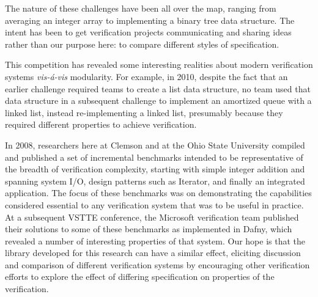 The nature of these challenges have been all over the map, ranging from averaging an integer array to implementing a binary tree data structure.  The intent has been to get verification projects communicating and sharing ideas rather than our purpose here: to compare different styles of specification.  

This competition has revealed some interesting realities about modern verification systems \emph{vis-\'{a}-vis} modularity.  For example, in 2010, despite the fact that an earlier challenge required teams to create a list data structure, no team used that data structure in a subsequent challenge to implement an amortized queue with a linked list, instead re-implementing a linked list, presumably because they required different properties to achieve verification.

In 2008, researchers here at Clemson and at the Ohio State University compiled and published\cite{Benchmarks} a set of incremental benchmarks intended to be representative of the breadth of verification complexity, starting with simple integer addition and spanning system I/O, design patterns such as Iterator, and finally an integrated application.  The focus of these benchmarks was on demonstrating the capabilities considered essential to any verification system that was to be useful in practice.  At a subsequent VSTTE conference, the Microsoft verification team published their solutions to some of these benchmarks as implemented in Dafny\cite{DafnySolutions}, which revealed a number of interesting properties of that system.  Our hope is that the library developed for this research can have a similar effect, eliciting discussion and comparison of different verification systems by encouraging other verification efforts to explore the effect of differing specification on properties of the verification.
